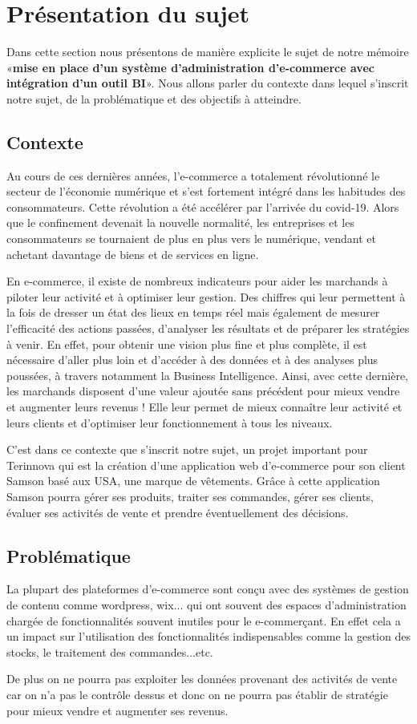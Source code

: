 \documentclass[a4paper, 12pt]{report}
\begin{document}
\section{Présentation du sujet}
{Dans cette section nous présentons de manière explicite le sujet de notre mémoire «\textbf{mise en place d’un système d’administration d’e-commerce avec intégration d’un outil BI}». Nous allons parler du contexte dans lequel s’inscrit notre sujet, de la problématique et des objectifs à atteindre.}
\subsection{Contexte}
{Au cours de ces dernières années, l'e-commerce a totalement révolutionné le secteur de l’économie numérique et s’est fortement intégré dans les habitudes des consommateurs. Cette révolution a été accélérer par l’arrivée du covid-19. Alors que le confinement devenait la nouvelle normalité, les entreprises et les consommateurs se tournaient de plus en plus vers le numérique, vendant et achetant davantage de biens et de services en ligne. 

En e-commerce, il existe de nombreux indicateurs pour aider les marchands à piloter leur activité et à optimiser leur gestion. Des chiffres qui leur permettent à la fois de dresser un état des lieux en temps réel mais également de mesurer l’efficacité des actions passées, d’analyser les résultats et de préparer les stratégies à venir. En effet, pour obtenir une vision plus fine et plus complète, il est nécessaire d’aller plus loin et d’accéder à des données et à des analyses plus poussées, à travers notamment la Business Intelligence. Ainsi, avec cette dernière, les marchands disposent d’une valeur ajoutée sans précédent pour mieux vendre et augmenter leurs revenus ! Elle leur permet de mieux connaître leur activité et leurs clients et d’optimiser leur fonctionnement à tous les niveaux.

C’est dans ce contexte que s'inscrit notre sujet, un projet important pour Terinnova qui est la création d'une application web d’e-commerce pour son client Samson basé aux USA, une marque de vêtements. Grâce à cette application Samson pourra gérer ses produits, traiter ses commandes, gérer ses clients, évaluer ses activités de vente et prendre éventuellement des décisions.}
\subsection{Problématique}
{La plupart des plateformes d’e-commerce sont conçu avec des systèmes de gestion de contenu comme wordpress, wix... qui ont souvent des espaces d’administration chargée de fonctionnalités souvent inutiles pour le e-commerçant. En effet cela a un impact sur l’utilisation des fonctionnalités indispensables comme la gestion des stocks, le traitement des commandes...etc.

De plus on ne pourra pas exploiter les données provenant des activités de vente car on n'a pas le contrôle dessus et donc on ne pourra pas établir de stratégie pour mieux vendre et augmenter ses revenus.}
\end{document}
